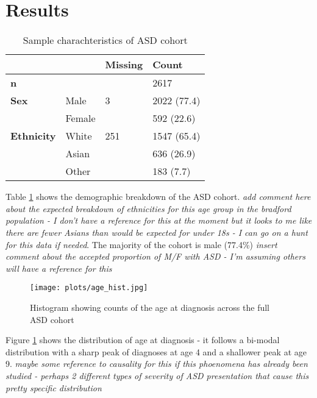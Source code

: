 \documentclass[
]{article}
\begin{document}
\hypertarget{results}{%
\section{Results}\label{results}}

\begin{table}[H]
\centering
\begin{scriptsize}
\begin{tabular}{llll}
\toprule
            & & Missing & Count \\
\midrule
\textbf{n} & & & 2617 \\[2mm]
\textbf{Sex} & Male & 3 & 2022 (77.4) \\
& Female & & 592 (22.6) \\[2mm]
\textbf{Ethnicity} & White & 251 & 1547 (65.4) \\
            & Asian & & 636 (26.9) \\
            & Other & & 183 (7.7) \\[2mm]
\bottomrule
\end{tabular}
\end{scriptsize}
\caption{Sample charachteristics of ASD cohort}
\label{tab:asd_cohort}
\end{table}

Table \ref{tab:asd_cohort} shows the demographic breakdown of the ASD
cohort.
\textit{add comment here about the expected breakdown of ethnicities for this age group in the bradford population - I don't have a reference for this at the moment but it looks to me like there are fewer Asians than would be expected for under 18s - I can go on a hunt for this data if needed}.
The majority of the cohort is male (77.4\%)
\textit{insert comment about the accepted proportion of M/F with ASD - I'm assuming others will have a reference for this}

\begin{figure}[H]
\centering
\texttt{[image: plots/age\_hist.jpg]}
\caption{Histogram showing counts of the age at diagnosis across the full ASD cohort}
\label{fig:age_hist}
\end{figure}

Figure \ref{fig:age_hist} shows the distribution of age at diagnosis -
it follows a bi-modal distribution with a sharp peak of diagnoses at age
4 and a shallower peak at age 9.
\textit{maybe some reference to causality for this if this phoenomena has already been studied - perhaps 2 different types of severity of ASD presentation that cause this pretty specific distribution}
\end{document}

